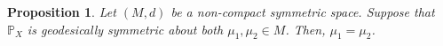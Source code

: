 \documentclass[preprint]{imsart}
\theoremstyle{plain}
\newtheorem{proposition}{Proposition}
\theoremstyle{remark}
\begin{document}










\begin{proposition}\label{prop:symmetry}
Let $(M,d)$ be a non-compact symmetric space. Suppose that $\mathbb{P}_{X}$ is geodesically symmetric about both $\mu_1, \mu_2 \in M$. Then, $\mu_1=\mu_2$.  
\end{proposition}
\end{document}
